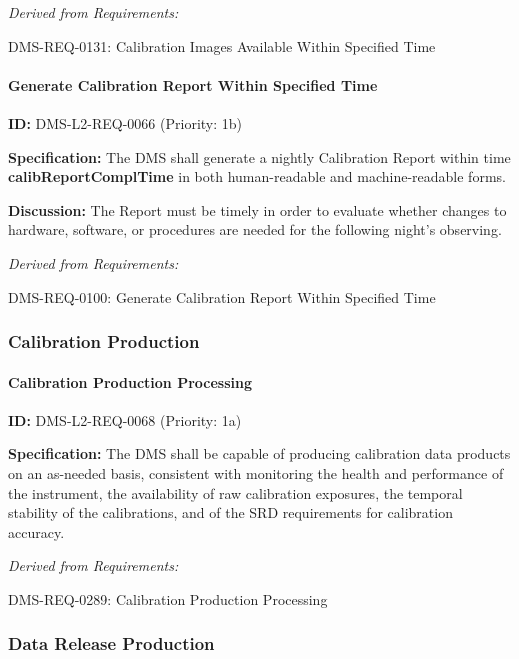 \documentclass[SE,toc,lsstdraft]{lsstdoc}
\begin{document}
\emph{Derived from Requirements:}

DMS-REQ-0131:
Calibration Images Available Within Specified Time \newline

\paragraph{Generate Calibration Report Within Specified Time}\hfill  %

\label{DMS-L2-REQ-0066}
\textbf{ID:} DMS-L2-REQ-0066 (Priority: 1b)

\textbf{Specification:} The DMS shall generate a nightly Calibration Report within time \textbf{calibReportComplTime }in both human-readable and machine-readable forms.

\textbf{Discussion:} The Report must be timely in order to evaluate whether changes to hardware, software, or procedures are needed for the following night's observing.

\emph{Derived from Requirements:}

DMS-REQ-0100:
Generate Calibration Report Within Specified Time \newline

\subsubsection{Calibration Production}

\paragraph{Calibration Production Processing}\hfill  %

\label{DMS-L2-REQ-0068}
\textbf{ID:} DMS-L2-REQ-0068 (Priority: 1a)

\textbf{Specification:} The DMS shall be capable of producing calibration data products on an as-needed basis, consistent with monitoring the health and performance of the instrument, the availability of raw calibration exposures, the temporal stability of the calibrations, and of the SRD requirements for calibration accuracy.

\emph{Derived from Requirements:}

DMS-REQ-0289:
Calibration Production Processing \newline

\subsubsection{Data Release Production}
\end{document}
